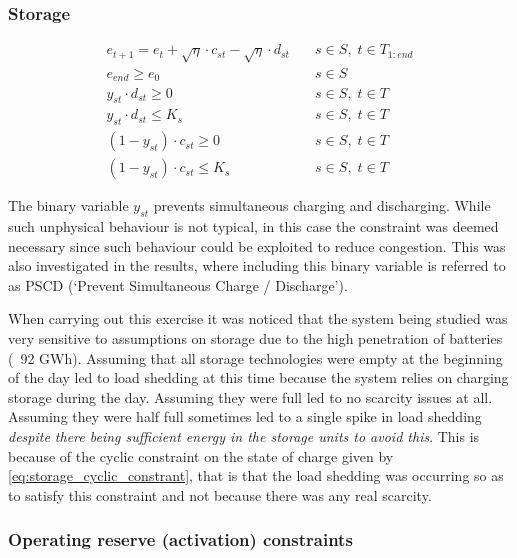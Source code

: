 \documentclass[number,times]{elsarticle}
\begin{document}
\subsubsection{Storage}

\begin{align}
    e_{t+1} = e_t + \sqrt{\eta} \cdot c_{st} - \sqrt{\eta} \cdot d_{st} & \quad s \in S, \; t \in T_{1:end}                   \\
    e_{end} \geq e_0                                                    & \quad s \in S   \label{eq:storage_cyclic_constrant} \\
    y_{st} \cdot d_{st} \geq 0                                          & \quad s \in S, \; t \in T                           \\
    y_{st} \cdot d_{st} \leq K_s                                        & \quad s \in S, \; t \in T                           \\
    (1 - y_{st}) \cdot c_{st} \geq 0                                    & \quad s \in S, \; t \in T                           \\
    (1 - y_{st}) \cdot c_{st} \leq K_s                                  & \quad s \in S, \; t \in T
\end{align}

The binary variable $y_{st}$ prevents simultaneous charging and discharging. While such unphysical behaviour is not typical, in this case the constraint was deemed necessary since such behaviour could be exploited to reduce congestion. This was also investigated in the results, where including this binary variable is referred to as PSCD (`Prevent Simultaneous Charge / Discharge').

When carrying out this exercise it was noticed that the system being studied was very sensitive to assumptions on storage due to the high penetration of batteries (~92 GWh). Assuming that all storage technologies were empty at the beginning of the day led to load shedding at this time because the system relies on charging storage during the day. Assuming they were full led to no scarcity issues at all. Assuming they were half full sometimes led to a single spike in load shedding \emph{despite there being sufficient energy in the storage units to avoid this}. This is because of the cyclic constraint on the state of charge given by \eqref{eq:storage_cyclic_constrant}, that is that the load shedding was occurring so as to satisfy this constraint and not because there was any real scarcity.

\subsubsection{Operating reserve (activation) constraints}
\end{document}
